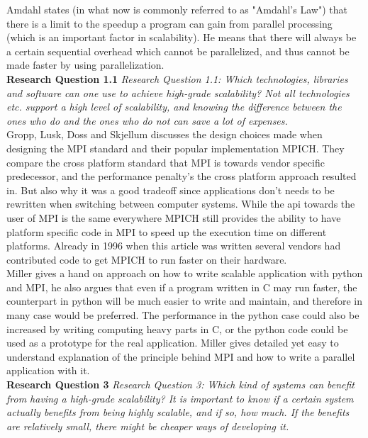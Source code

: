 \documentclass{article}
\begin{document}
{Amdahl \cite{amdahl1967validity} states (in what now is commonly referred to as
"Amdahl's Law") that there is a limit to the speedup a program can gain from
parallel processing (which is an important factor in scalability).  He means
that there will always be a certain sequential overhead which cannot be
parallelized, and thus cannot be made faster by using parallelization.
\\

\noindent\textbf{Research Question 1.1}
{\scriptsize \emph{Research Question 1.1: Which technologies, libraries and
software can one use to achieve high-grade scalability? Not all technologies
etc. support a high level of scalability, and knowing the difference between
the ones who do and the ones who do not can save a lot of expenses.}}
\\

Gropp, Lusk, Doss and Skjellum\cite{gropp1996high} discusses the design choices made when
designing the MPI standard and their popular implementation MPICH. They
compare the cross platform standard that MPI is towards vendor specific
predecessor, and the performance penalty's the cross platform approach resulted
in. But also why it was a good tradeoff since applications don't needs to be
rewritten when switching between computer systems. While the api towards
the user of MPI is the same everywhere MPICH still provides the ability to
have platform specific code in MPI to speed up the execution time on different
platforms. Already in 1996 when this article was written several vendors
had contributed code to get MPICH to run faster on their hardware.
\\

Miller \cite{millerparallel}\cite{miller2002pympi} gives a hand on approach on
how to write scalable application with python and MPI, he also argues that
even if a program written in C may run faster, the counterpart in python will
be much easier to write and maintain, and therefore in many case would be
preferred. The performance in the python case could also be increased by
writing computing heavy parts in C, or the python code could be used as a 
prototype for the real application. Miller gives detailed yet easy to 
understand explanation of the principle behind MPI and how to write a
parallel application with it.
\\

\noindent\textbf{Research Question 3}
{\scriptsize \emph{Research Question 3: Which kind of systems can benefit from
having a high-grade scalability? It is important to know if a certain system
actually benefits from being highly scalable, and if so, how much. If the
benefits are relatively small, there might be cheaper ways of developing it.}}
\\

}
\end{document}
